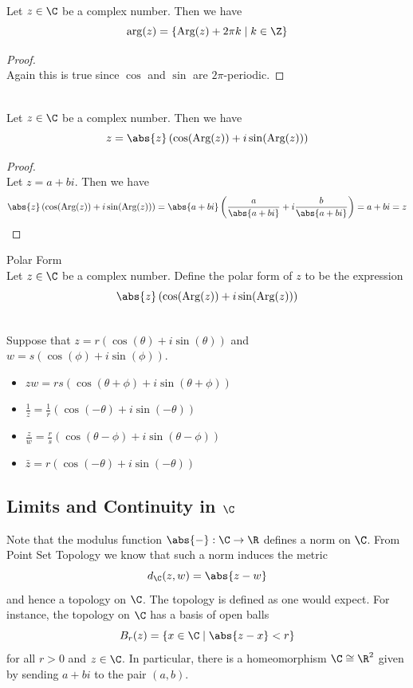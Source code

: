 \documentclass[a4paper]{article}
\begin{document}
\begin{lmm}{}{}\\
Let $z\in\C$ be a complex number. Then we have $$\arg(z)=\{\text{Arg}(z)+2\pi k\;|\;k\in\Z\}$$
\begin{proof}\\
Again this is true since $\cos$ and $\sin$ are $2\pi$-periodic. 
\end{proof}
\end{lmm}

\begin{prp}{}{}\\
Let $z\in\C$ be a complex number. Then we have $$z=\abs{z}\left(\cos(\text{Arg}(z))+i\sin(\text{Arg}(z))\right)$$
\begin{proof}\\
Let $z=a+bi$. Then we have $$\abs{z}\left(\cos(\text{Arg}(z))+i\sin(\text{Arg}(z))\right)=\abs{a+bi}\left(\frac{a}{\abs{a+bi}}+i\frac{b}{\abs{a+bi}}\right)=a+bi=z$$
\end{proof}
\end{prp}

\begin{defn}{Polar Form}{}\\
Let $z\in\C$ be a complex number. Define the polar form of $z$ to be the expression $$\abs{z}\left(\cos(\text{Arg}(z))+i\sin(\text{Arg}(z))\right)$$
\end{defn}

\begin{prp}{}{}\\
Suppose that $z=r(\cos{(\theta)}+i\sin{(\theta)})$ and $w=s(\cos{(\phi)}+i\sin{(\phi)})$. 
\begin{itemize}
\item $zw=rs(\cos{(\theta+\phi)}+i\sin{(\theta+\phi)})$
\item $\frac{1}{z}=\frac{1}{r}(\cos{(-\theta)}+i\sin{(-\theta)})$
\item $\frac{z}{w}=\frac{r}{s}(\cos{(\theta-\phi)}+i\sin{(\theta-\phi)})$
\item $\bar{z}=r(\cos{(-\theta)}+i\sin{(-\theta)})$
\end{itemize}
\end{prp}

\subsection{Limits and Continuity in $\C$}
Note that the modulus function $\abs{-}:\C\to\R$ defines a norm on $\C$. From Point Set Topology we know that such a norm induces the metric $$d_\C(z,w)=\abs{z-w}$$ and hence a topology on $\C$. The topology is defined as one would expect. For instance, the topology on $\C$ has a basis of open balls $$B_r(z)=\{x\in\C\;|\;\abs{z-x}<r\}$$ for all $r>0$ and $z\in\C$. In particular, there is a homeomorphism $\C\cong\R^2$ given by sending $a+bi$ to the pair $(a,b)$. \\
\end{document}
